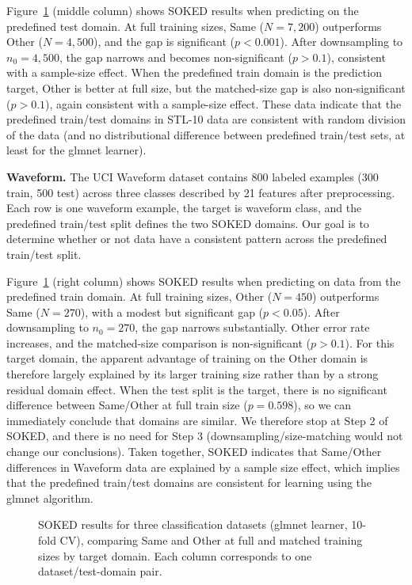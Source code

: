 \documentclass[twoside]{article}
\begin{document}
Figure~\ref{fig:classif-pairs} (middle column) shows SOKED results when predicting on the predefined test domain.
At full training sizes, Same ($N=7{,}200$) outperforms Other ($N=4{,}500$), and the gap is significant ($p < 0.001$).
After downsampling to $n_0 = 4{,}500$, the gap narrows and becomes non-significant ($p > 0.1$), consistent with a sample-size effect.
When the predefined train domain is the prediction target, Other is better at full size, but the matched-size gap is also non-significant ($p > 0.1$), again consistent with a sample-size effect.
These data indicate that the predefined train/test domains in STL-10 data are consistent with random division of the data (and no distributional difference between predefined train/test sets, at least for the glmnet learner).

\textbf{Waveform.}
The UCI Waveform dataset \citep{Breiman1984} contains 800 labeled examples (300 train, 500 test) across three classes described by 21 features after preprocessing.
Each row is one waveform example, the target is waveform class, and the predefined train/test split defines the two SOKED domains.
Our goal is to determine whether or not data have a consistent pattern across the predefined train/test split.

Figure~\ref{fig:classif-pairs} (right column) shows SOKED results when predicting on data from the predefined train domain.
At full training sizes, Other ($N=450$) outperforms Same ($N=270$), with a modest but significant gap ($p < 0.05$).
After downsampling to $n_0 = 270$, the gap narrows substantially.
Other error rate increases, and the matched-size comparison is non-significant ($p > 0.1$).
For this target domain, the apparent advantage of training on the Other domain is therefore largely explained by its larger training size rather than by a strong residual domain effect.
When the test split is the target, there is no significant difference between Same/Other at full train size ($p=0.598$), so we can immediately conclude that domains are similar.
We therefore stop at Step 2 of SOKED, and there is no need for Step 3 (downsampling/size-matching would not change our conclusions).
Taken together, SOKED indicates that Same/Other differences in Waveform data are explained by a sample size effect, which implies that the predefined train/test domains are consistent for learning using the glmnet algorithm.

\begin{figure}[!t]
    \centering
    \def\pairfigure{fig4-classif-pairs.png}
    \def\firstdomain{2020}\def\seconddomain{test}\def\thirddomain{train}
    
    \caption{
    SOKED results for three classification datasets (glmnet learner, 10-fold CV), comparing Same and Other at full and matched training sizes by target domain.
    Each column corresponds to one dataset/test-domain pair.}
    \label{fig:classif-pairs}
\end{figure}
\end{document}
